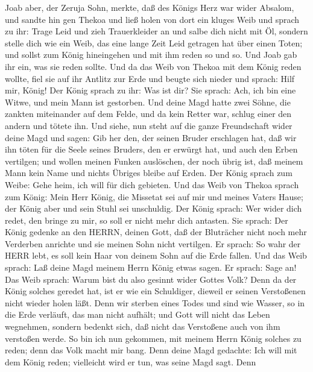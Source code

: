  Joab aber, der Zeruja Sohn, merkte, daß des Königs Herz war
wider Absalom,  und sandte hin gen Thekoa und ließ holen von
dort ein kluges Weib und sprach zu ihr: Trage Leid und zieh
Trauerkleider an und salbe dich nicht mit Öl, sondern stelle dich wie
ein Weib, das eine lange Zeit Leid getragen hat über einen Toten;
 und sollst zum König hineingehen und mit ihm reden so und
so. Und Joab gab ihr ein, was sie reden sollte.  Und da das
Weib von Thekoa mit dem König reden wollte, fiel sie auf ihr Antlitz zur
Erde und beugte sich nieder und sprach: Hilf mir, König! 
Der König sprach zu ihr: Was ist dir? Sie sprach: Ach, ich bin eine
Witwe, und mein Mann ist gestorben.  Und deine Magd hatte
zwei Söhne, die zankten miteinander auf dem Felde, und da kein Retter
war, schlug einer den andern und tötete ihn.  Und siehe, nun
steht auf die ganze Freundschaft wider deine Magd und sagen: Gib her
den, der seinen Bruder erschlagen hat, daß wir ihn töten für die Seele
seines Bruders, den er erwürgt hat, und auch den Erben vertilgen; und
wollen meinen Funken auslöschen, der noch übrig ist, daß meinem Mann
kein Name und nichts Übriges bleibe auf Erden.  Der König
sprach zum Weibe: Gehe heim, ich will für dich gebieten. 
Und das Weib von Thekoa sprach zum König: Mein Herr König, die Missetat
sei auf mir und meines Vaters Hause; der König aber und sein Stuhl sei
unschuldig.  Der König sprach: Wer wider dich redet, den
bringe zu mir, so soll er nicht mehr dich antasten.  Sie
sprach: Der König gedenke an den HERRN, deinen Gott, daß der Bluträcher
nicht noch mehr Verderben anrichte und sie meinen Sohn nicht vertilgen.
Er sprach: So wahr der HERR lebt, es soll kein Haar von deinem Sohn auf
die Erde fallen.  Und das Weib sprach: Laß deine Magd
meinem Herrn König etwas sagen. Er sprach: Sage an!  Das
Weib sprach: Warum bist du also gesinnt wider Gottes Volk? Denn da der
König solches geredet hat, ist er wie ein Schuldiger, dieweil er seinen
Verstoßenen nicht wieder holen läßt.  Denn wir sterben
eines Todes und sind wie Wasser, so in die Erde verläuft, das man nicht
aufhält; und Gott will nicht das Leben wegnehmen, sondern bedenkt sich,
daß nicht das Verstoßene auch von ihm verstoßen werde.  So
bin ich nun gekommen, mit meinem Herrn König solches zu reden; denn das
Volk macht mir bang. Denn deine Magd gedachte: Ich will mit dem König
reden; vielleicht wird er tun, was seine Magd sagt.  Denn
